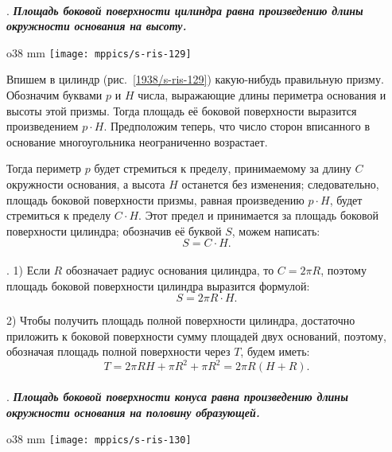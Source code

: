 \paragraph{}\label{1938/s112}
.
\textbf{\emph{Площадь боковой поверхности цилиндра равна произведению длины окружности основания на высоту.}}

\begin{wrapfigure}{o}{38 mm}
\vskip-0mm
\centering
\texttt{[image: mppics/s-ris-129]}
\caption{}\label{1938/s-ris-129}
\vskip-0mm
\end{wrapfigure}

Впишем в цилиндр (рис.~\ref{1938/s-ris-129}) какую-нибудь правильную призму.
Обозначим буквами $p$ и $H$ числа, выражающие длины периметра основания и высоты этой призмы.
Тогда площадь её боковой поверхности выразится произведением $p\cdot H$.
Предположим теперь, что число сторон вписанного в основание многоугольника неограниченно возрастает.

Тогда периметр $p$ будет стремиться к пределу, принимаемому за длину $C$ окружности основания, а высота $H$ останется без изменения;
следовательно, площадь боковой поверхности призмы, равная произведению $p\cdot H$, будет стремиться к пределу $C\cdot H$.
Этот предел и принимается за площадь боковой поверхности цилиндра;
обозначив её буквой $S$, можем написать:
\[S = C\cdot H.\]

\paragraph{}\label{1938/s113}
. 1) Если $R$ обозначает радиус основания цилиндра, то $C= 2\pi R$, поэтому площадь боковой поверхности цилиндра выразится формулой:
\[S = 2\pi R \cdot H.\]

2) Чтобы получить площадь полной поверхности цилиндра, достаточно приложить к боковой поверхности сумму площадей двух оснований, поэтому, обозначая площадь полной поверхности через $T$, будем иметь:
\[T= 2\pi RH + \pi R^2 + \pi R^2 = 2\pi R(H + R).\]

\paragraph{}\label{1938/s114}
.
\textbf{\emph{Площадь боковой поверхности конуса равна произведению длины окружности основания на половину образующей.}}

\begin{wrapfigure}{o}{38 mm}
\vskip-0mm
\centering
\texttt{[image: mppics/s-ris-130]}
\caption{}\label{1938/s-ris-130}
\vskip-0mm
\end{wrapfigure}

